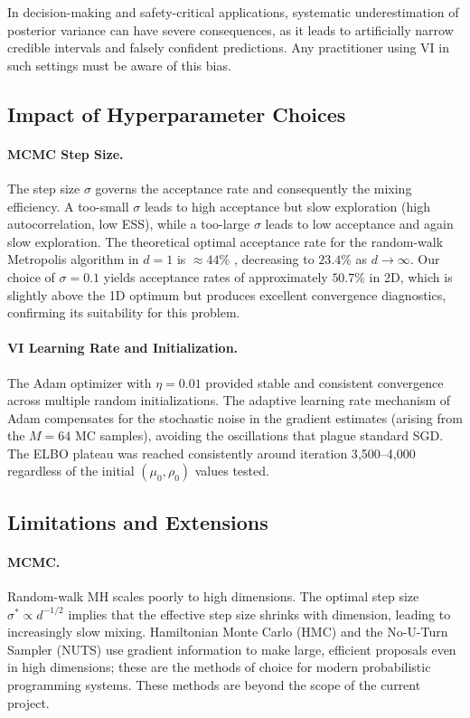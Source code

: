 \documentclass[12pt,a4paper]{article}
\begin{document}
In decision-making and safety-critical applications, systematic
underestimation of posterior variance can have severe consequences,
as it leads to artificially narrow credible intervals and falsely
confident predictions.
Any practitioner using VI in such settings must be aware of this bias.

\subsection{Impact of Hyperparameter Choices}

\paragraph{MCMC Step Size.}
The step size $\sigma$ governs the acceptance rate and consequently
the mixing efficiency.
A too-small $\sigma$ leads to high acceptance but slow exploration
(high autocorrelation, low ESS), while a too-large $\sigma$ leads to
low acceptance and again slow exploration.
The theoretical optimal acceptance rate for the random-walk
Metropolis algorithm in $d = 1$ is $\approx 44\%$ \citep{roberts1997weak},
decreasing to $23.4\%$ as $d \to \infty$.
Our choice of $\sigma = 0.1$ yields acceptance rates of approximately
$50.7\%$ in 2D, which is slightly above the 1D optimum but produces
excellent convergence diagnostics, confirming its suitability for this problem.

\paragraph{VI Learning Rate and Initialization.}
The Adam optimizer \citep{kingma2014adam} with $\eta = 0.01$ provided
stable and consistent convergence across multiple random initializations.
The adaptive learning rate mechanism of Adam compensates for the
stochastic noise in the gradient estimates (arising from the $M = 64$
MC samples), avoiding the oscillations that plague standard SGD.
The ELBO plateau was reached consistently around iteration 3{,}500--4{,}000
regardless of the initial $(\mu_0, \rho_0)$ values tested.

\subsection{Limitations and Extensions}

\paragraph{MCMC.}
Random-walk MH scales poorly to high dimensions.
The optimal step size $\sigma^* \propto d^{-1/2}$ \citep{roberts1997weak}
implies that the effective step size shrinks with dimension, leading
to increasingly slow mixing.
Hamiltonian Monte Carlo (HMC) and the No-U-Turn Sampler (NUTS)
\citep{hoffman2014no} use gradient information to make large,
efficient proposals even in high dimensions; these are the
methods of choice for modern probabilistic programming systems.
These methods are beyond the scope of the current project.
\end{document}
